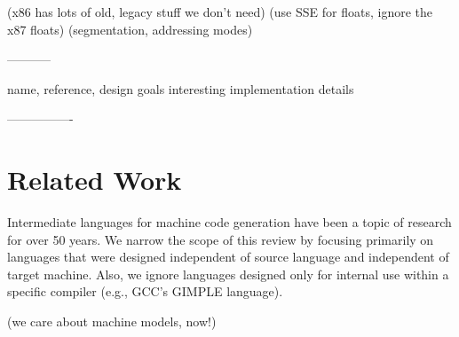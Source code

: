 (x86 has lots of old, legacy stuff we don't need)
(use SSE for floats, ignore the x87 floats)
(segmentation, addressing modes)

-----------

name, reference,
design goals
interesting implementation details

----------------

\section{Related Work}

Intermediate languages for machine code generation have been a topic of research
for over 50 years. We narrow the scope of this review by
focusing primarily on languages that were designed independent of source language
and independent of target machine. Also, we ignore languages designed
only for internal use within a specific compiler (e.g., GCC's GIMPLE language).

(we care about machine models, now!)

